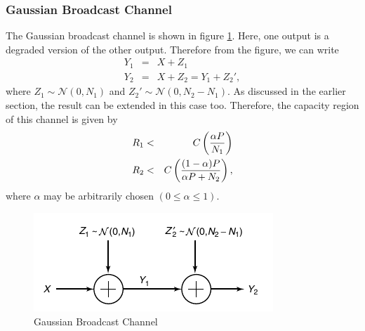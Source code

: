\subsubsection{Gaussian Broadcast Channel}
The Gaussian broadcast channel is shown in figure \ref{fig:GBC}. Here, one output is a degraded version of the other output. Therefore from the figure, we can write
%
\begin{eqnarray}
    Y_1 &=& X+Z_1 \\
    Y_2 &=& X+Z_2 = Y_1+Z_2',
\end{eqnarray}
%
where $Z_1 \sim \mathcal{N}(0, N_1)$ and $Z_2' \sim \mathcal{N}(0, N_2-N_1)$. As discussed in the earlier section, the result can be extended in this case too. Therefore, the capacity region of this channel is given by
%
\begin{eqnarray}
    R_1 &<& C\left(\frac{\alpha P}{N_1}\right) \\
    R_2 &<& C\left(\frac{(1-\alpha) P}{\alpha P+N_2}\right),
\end{eqnarray}
%
where $\alpha$ may be arbitrarily chosen $(0 \leq \alpha \leq 1)$.
%
\begin{figure}[h]
    \centering
    \includegraphics[scale=0.6]{Diagrams/GBC.png}
    \caption{Gaussian Broadcast Channel}
    \label{fig:GBC}
\end{figure}